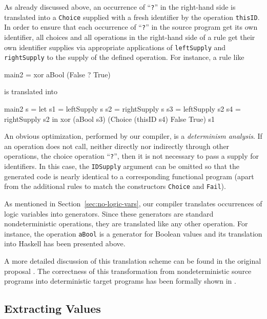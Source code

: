 \documentclass{llncs}
\newcommand{\code}[1]{\mbox{\small\texttt{#1}}}
\newcommand{\ccode}[1]{``\code{#1}''}
\begin{document}
As already discussed above, an occurrence of \ccode{?}
in the right-hand side is translated into a \code{Choice} supplied
with a fresh identifier by the operation \code{thisID}.
In order to ensure that each occurrence of \ccode{?} in the source program
get its own identifier, all choices and all operations in the right-hand
side of a rule get their own identifier supplies via appropriate
applications of \code{leftSupply} and \code{rightSupply}
to the supply of the defined operation.
For instance, a rule like
\begin{curry}
  main2 = xor aBool (False ? True)
\end{curry}
is translated into
\begin{haskell}
  main2 s = let s1 = leftSupply  s
                s2 = rightSupply s
                s3 = leftSupply  s2
                s4 = rightSupply s2
             in xor (aBool s3) (Choice (thisID s4) False True) s1
\end{haskell}
An obvious optimization, performed by our compiler,
is a \emph{determinism analysis}.
If an operation does not call, neither directly nor indirectly through
other operations, the choice operation \ccode{?},
then it is not necessary to pass a supply for identifiers.
In this case, the \code{IDSupply} argument can be omitted
so that the generated code is nearly identical to a corresponding
functional program (apart from the additional rules to match
the constructors \code{Choice} and \code{Fail}).

As mentioned in Section~\ref{sec:no-logic-vars},
our compiler translates occurrences of logic variables
into generators. Since these generators are standard
nondeterministic operations, they are translated like any other operation.
For instance, the operation \code{aBool} is a generator for
Boolean values and its translation into Haskell has been presented above.

A more detailed discussion of this translation scheme can be found
in the original proposal \cite{BrasselFischer08IFL}.
The correctness of this transformation from nondeterministic source programs
into deterministic target programs has been formally shown
in \cite{Brassel11Thesis}.


\subsection{Extracting Values}
\end{document}
